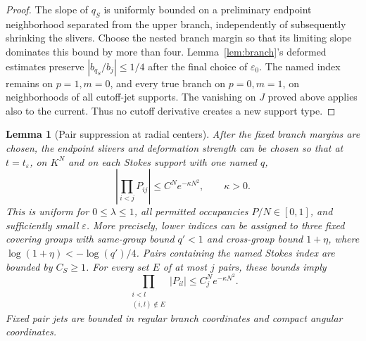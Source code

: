 \documentclass[11pt]{article}
\numberwithin{equation}{section}
\newtheorem{lemma}[theorem]{Lemma}
\theoremstyle{definition}
\newcommand{\eps}{\varepsilon}
\begin{document}
\begin{proof}
The slope of \(q_S\) is uniformly bounded on a preliminary
endpoint neighborhood separated from the upper branch, independently
of subsequently shrinking the slivers. Choose the nested branch
margin so that its limiting slope dominates this bound by more
than four. Lemma~\ref{lem:branch}'s deformed estimates preserve
\(|b_{q_S}/b_j|\le1/4\) after the final choice of \(\eps_0\).
The named index remains on \(p=1,m=0\), and every true branch
on \(p=0,m=1\), on neighborhoods of all cutoff-jet supports.
The vanishing on \(J\) proved above applies also to the current.
Thus no cutoff derivative creates a new support type.
\end{proof}

\begin{lemma}[Pair suppression at radial centers]\label{lem:contraction}
After the fixed branch margins are chosen, the endpoint slivers and
deformation strength can be chosen so that at \(t=t_\eps\), on
\(K^N\) and on each Stokes support with one named \(q\),
\[
 \left|\prod_{i<j}P_{ij}\right|\le C^Ne^{-\kappa N^2},
 \qquad \kappa>0 .
\]
This is uniform for \(0\le\lambda\le1\), all permitted occupancies
\(P/N\in[0,1]\), and sufficiently small \(\eps\).
More precisely, lower indices can be assigned to three fixed
covering groups with same-group bound \(q'<1\) and cross-group
bound \(1+\eta\), where \(\log(1+\eta)<-\log(q')/4\).
Pairs containing the named Stokes index are bounded by \(C_S\ge1\).
For every set \(E\) of at most \(j\) pairs, these bounds imply
\[
 \prod_{\substack{i<l\\(i,l)\notin E}}|P_{il}|
       \le C_j^N e^{-\kappa N^2}.
\]
Fixed pair jets are bounded in regular branch coordinates and
compact angular coordinates.
\end{lemma}
\end{document}
